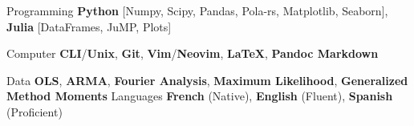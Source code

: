

\begin{cvskills}

	\cvskill
	{Programming} %
	{\textbf{Python} [Numpy, Scipy, Pandas, Pola-rs, Matplotlib, Seaborn], \textbf{Julia} [DataFrames, JuMP, Plots]}  %

	\cvskill
	{Computer}
	{\textbf{CLI}/\textbf{Unix}, \textbf{Git}, \textbf{Vim}/\textbf{Neovim}, \textbf{LaTeX}, \textbf{Pandoc Markdown} }

	\cvskill
	{Data}
	{\textbf{OLS}, \textbf{ARMA}, \textbf{Fourier Analysis}, \textbf{Maximum Likelihood}, \textbf{Generalized Method Moments}}
	\cvskill
	{Languages} %
	{\textbf{French} (Native), \textbf{English} (Fluent), \textbf{Spanish} (Proficient)} %

\end{cvskills}
